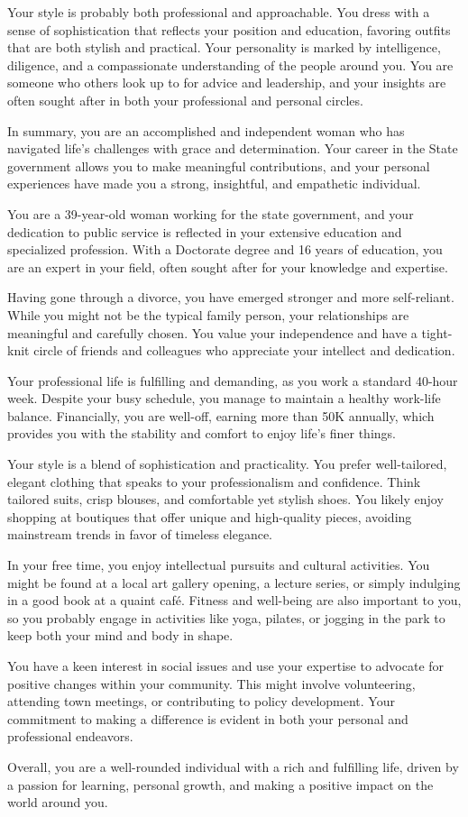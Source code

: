 Your style is probably both professional and approachable. You dress with a sense of sophistication that reflects your position and education, favoring outfits that are both stylish and practical. Your personality is marked by intelligence, diligence, and a compassionate understanding of the people around you. You are someone who others look up to for advice and leadership, and your insights are often sought after in both your professional and personal circles.

In summary, you are an accomplished and independent woman who has navigated life's challenges with grace and determination. Your career in the State government allows you to make meaningful contributions, and your personal experiences have made you a strong, insightful, and empathetic individual.


You are a 39-year-old woman working for the state government, and your dedication to public service is reflected in your extensive education and specialized profession. With a Doctorate degree and 16 years of education, you are an expert in your field, often sought after for your knowledge and expertise.

Having gone through a divorce, you have emerged stronger and more self-reliant. While you might not be the typical family person, your relationships are meaningful and carefully chosen. You value your independence and have a tight-knit circle of friends and colleagues who appreciate your intellect and dedication.

Your professional life is fulfilling and demanding, as you work a standard 40-hour week. Despite your busy schedule, you manage to maintain a healthy work-life balance. Financially, you are well-off, earning more than 50K annually, which provides you with the stability and comfort to enjoy life’s finer things.

Your style is a blend of sophistication and practicality. You prefer well-tailored, elegant clothing that speaks to your professionalism and confidence. Think tailored suits, crisp blouses, and comfortable yet stylish shoes. You likely enjoy shopping at boutiques that offer unique and high-quality pieces, avoiding mainstream trends in favor of timeless elegance.

In your free time, you enjoy intellectual pursuits and cultural activities. You might be found at a local art gallery opening, a lecture series, or simply indulging in a good book at a quaint café. Fitness and well-being are also important to you, so you probably engage in activities like yoga, pilates, or jogging in the park to keep both your mind and body in shape.

You have a keen interest in social issues and use your expertise to advocate for positive changes within your community. This might involve volunteering, attending town meetings, or contributing to policy development. Your commitment to making a difference is evident in both your personal and professional endeavors.

Overall, you are a well-rounded individual with a rich and fulfilling life, driven by a passion for learning, personal growth, and making a positive impact on the world around you.

